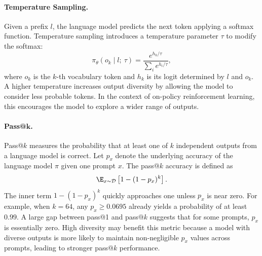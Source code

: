 \documentclass{article} %
\newcommand{\defeq}{\mathrel{\stackrel{\textnormal{\tiny def}}{=}}}
\newcommand{\outputval}{y}
\newcommand{\inputval}{x}
\newcommand{\ych}[1]{\textcolor{purple}{[#1 -Chenghao]}}
\begin{document}

\paragraph{Temperature Sampling.}
Given a prefix $l$, the language model predicts the next token applying a softmax function. Temperature sampling \citep{ACKLEY1985147} introduces a temperature parameter $\tau$ to modify the softmax:
\[
\pi_\theta(o_k\mid l;~\tau) = \frac{e^{h_k/\tau}}{\sum_{i}e^{h_i/\tau}},
\]
where $o_k$ is the $k$-th vocabulary token and $h_k$ is its logit determined by $l$ and $o_k$. A higher temperature increases output diversity by allowing the model to consider less probable tokens. In the context of on-policy reinforcement learning, this encourages the model to explore a wider range of outputs.

\paragraph{Pass@$\bm k$.} Pass@$k$ measures the probability that at least one of $k$ independent outputs from a language model is correct. Let $p_x$ denote the underlying accuracy of the language model $\pi$ given one prompt $x$. The pass@$k$ accuracy is defined as
\[
\E_{x\sim\mathcal{D}}\left[1-(1-p_x)^k\right].
\]
The inner term $1-(1-p_x)^k$ quickly approaches one unless $p_x$ is near zero. For example, when $k=64$, any $p_x \geq 0.0695$ already yields a probability of at least $0.99$. A large gap between pass@1 and pass@$k$ suggests that for some prompts, $p_x$ is essentially zero. 
High diversity may benefit this metric because a model with diverse outputs is more likely to maintain non-negligible $p_x$ values across prompts, leading to stronger pass@$k$ performance.
\end{document}
